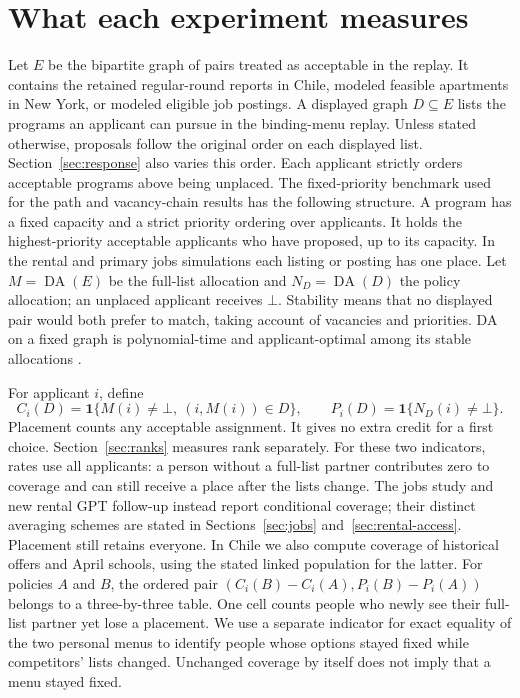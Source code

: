\documentclass[format=acmsmall,review=false]{acmart}
\newcommand{\da}{\operatorname{DA}}
\begin{document}
\section{What each experiment measures}\label{sec:design}
Let $E$ be the bipartite graph of pairs treated as acceptable in the replay. It contains the retained regular-round reports in Chile, modeled feasible apartments in New York, or modeled eligible job postings. A displayed graph $D\subseteq E$ lists the programs an applicant can pursue in the binding-menu replay. Unless stated otherwise, proposals follow the original order on each displayed list. Section~\ref{sec:response} also varies this order. Each applicant strictly orders acceptable programs above being unplaced. The fixed-priority benchmark used for the path and vacancy-chain results has the following structure. A program has a fixed capacity and a strict priority ordering over applicants. It holds the highest-priority acceptable applicants who have proposed, up to its capacity. In the rental and primary jobs simulations each listing or posting has one place. Let $M=\da(E)$ be the full-list allocation and $N_D=\da(D)$ the policy allocation; an unplaced applicant receives $\bot$. Stability means that no displayed pair would both prefer to match, taking account of vacancies and priorities. DA on a fixed graph is polynomial-time and applicant-optimal among its stable allocations \citep{gale1962,roth1986}.

For applicant $i$, define
\[
 C_i(D)=\mathbf{1}\{M(i)\ne\bot,\ (i,M(i))\in D\},\qquad
 P_i(D)=\mathbf{1}\{N_D(i)\ne\bot\}.
\]
Placement counts any acceptable assignment. It gives no extra credit for a first choice. Section~\ref{sec:ranks} measures rank separately. For these two indicators, rates use all applicants: a person without a full-list partner contributes zero to coverage and can still receive a place after the lists change. The jobs study and new rental GPT follow-up instead report conditional coverage; their distinct averaging schemes are stated in Sections~\ref{sec:jobs} and~\ref{sec:rental-access}. Placement still retains everyone. In Chile we also compute coverage of historical offers and April schools, using the stated linked population for the latter. For policies $A$ and $B$, the ordered pair $(C_i(B)-C_i(A),P_i(B)-P_i(A))$ belongs to a three-by-three table. One cell counts people who newly see their full-list partner yet lose a placement. We use a separate indicator for exact equality of the two personal menus to identify people whose options stayed fixed while competitors' lists changed. Unchanged coverage by itself does not imply that a menu stayed fixed.
\end{document}
